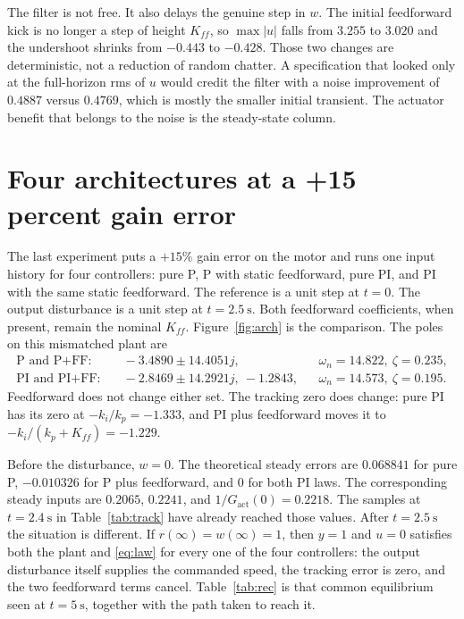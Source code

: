 \documentclass[12pt,a4paper]{article}
\begin{document}
The filter is not free. It also delays the genuine step in \(w\).
The initial feedforward kick is no longer a step of height \(K_{ff}\), so \(\max|u|\) falls from \(3.255\) to \(3.020\) and the undershoot shrinks from \(-0.443\) to \(-0.428\).
Those two changes are deterministic, not a reduction of random chatter.
A specification that looked only at the full-horizon rms of \(u\) would credit the filter with a noise improvement of \(0.4887\) versus \(0.4769\), which is mostly the smaller initial transient.
The actuator benefit that belongs to the noise is the steady-state column.

\section{Four architectures at a +15 percent gain error}
\label{sec:arch}

The last experiment puts a \(+15\%\) gain error on the motor and runs one input history for four controllers: pure P, P with static feedforward, pure PI, and PI with the same static feedforward.
The reference is a unit step at \(t=0\). The output disturbance is a unit step at \(t=2.5~\mathrm{s}\).
Both feedforward coefficients, when present, remain the nominal \(K_{ff}\).
Figure~\ref{fig:arch} is the comparison. The poles on this mismatched plant are
\begin{align*}
  \text{P and P+FF:}&\quad -3.4890\pm 14.4051j,
  &&\omega_n=14.822,\ \zeta=0.235,\\
  \text{PI and PI+FF:}&\quad -2.8469\pm 14.2921j,\ -1.2843,
  &&\omega_n=14.573,\ \zeta=0.195.
\end{align*}
Feedforward does not change either set. The tracking zero does change: pure PI has its zero at \(-k_i/k_p=-1.333\), and PI plus feedforward moves it to \(-k_i/(k_p+K_{ff})=-1.229\).

Before the disturbance, \(w=0\).
The theoretical steady errors are \(0.068841\) for pure P, \(-0.010326\) for P plus feedforward, and \(0\) for both PI laws.
The corresponding steady inputs are \(0.2065\), \(0.2241\), and \(1/G_{\mathrm{act}}(0)=0.2218\).
The samples at \(t=2.4~\mathrm{s}\) in Table~\ref{tab:track} have already reached those values.
After \(t=2.5~\mathrm{s}\) the situation is different. If \(r(\infty)=w(\infty)=1\), then \(y=1\) and \(u=0\) satisfies both the plant and \eqref{eq:law} for every one of the four controllers: the output disturbance itself supplies the commanded speed, the tracking error is zero, and the two feedforward terms cancel.
Table~\ref{tab:rec} is that common equilibrium seen at \(t=5~\mathrm{s}\), together with the path taken to reach it.
\end{document}
